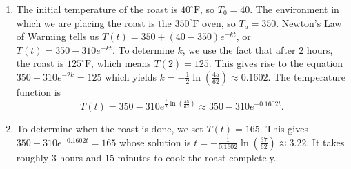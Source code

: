 {
\begin{enumerate}

\item  The initial temperature of the roast is $40^{\circ}\mbox{F}$, so $T_{0} = 40$.  The environment in which we are placing the roast is the $350^{\circ}\mbox{F}$ oven, so $T_{a} = 350$. Newton's Law of Warming tells us $T(t) = 350 + (40-350)e^{-kt}$, or $T(t) = 350 - 310e^{-kt}$.  To determine $k$, we use the fact that after $2$ hours, the roast is  $125^{\circ}\mbox{F}$, which means $T(2) = 125$.  This gives rise to the equation $350 - 310e^{-2k} = 125$ which yields $k = -\frac{1}{2} \ln \left( \frac{45}{62}  \right) \approx 0.1602$.  The temperature function is \[T(t) = 350 - 310 e^{\frac{t}{2} \ln \left( \frac{45}{62}  \right)} \approx 350- 310 e^{-0.1602 t}.\]


\item  To determine when the roast is done, we set $T(t) = 165$.  This gives $350- 310 e^{-0.1602 t} = 165$ whose solution is $t = -\frac{1}{0.1602} \ln \left( \frac{37}{62}  \right) \approx 3.22$.  It takes roughly $3$ hours and $15$ minutes to cook the roast completely. 

\end{enumerate}
}

\medskip

